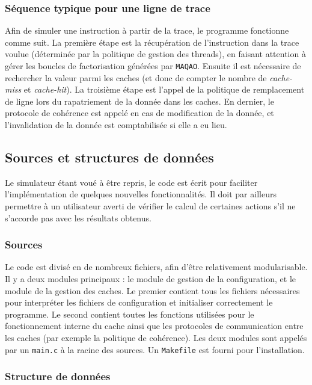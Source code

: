 \subsubsection{Séquence typique pour une ligne de trace}

Afin de simuler une instruction à partir de la trace, le programme fonctionne comme suit. La première étape est la récupération de l'instruction dans la trace voulue (déterminée par la politique de gestion des threads), en faisant attention à gérer les boucles de factorisation générées par \texttt{MAQAO}. Ensuite il est nécessaire de rechercher la valeur parmi les caches (et donc de compter le nombre de \emph{cache-miss} et \emph{cache-hit}). La troisième étape est l'appel de la politique de remplacement de ligne lors du rapatriement de la donnée dans les caches. En dernier, le protocole de cohérence est appelé en cas de modification de la donnée, et l'invalidation de la donnée est comptabilisée si elle a eu lieu.

\subsection{Sources et structures de données}

Le simulateur étant voué à être repris, le code est écrit pour faciliter l'implémentation de quelques nouvelles fonctionnalités. Il doit par ailleurs permettre à un utilisateur averti de vérifier le calcul de certaines actions s'il ne s'accorde pas avec les résultats obtenus.

\subsubsection{Sources}

Le code est divisé en de nombreux fichiers, afin d'être relativement modularisable. Il y a deux modules principaux : le module de gestion de la configuration, et le module de la gestion des caches. Le premier contient tous les fichiers nécessaires pour interpréter les fichiers de configuration et initialiser correctement le programme. Le second contient toutes les fonctions utilisées pour le fonctionnement interne du cache ainsi que les protocoles de communication entre les caches (par exemple la politique de cohérence). Les deux modules sont appelés par un \verb!main.c! à la racine des sources. Un \verb!Makefile! est fourni pour l'installation.

\subsubsection{Structure de données}

